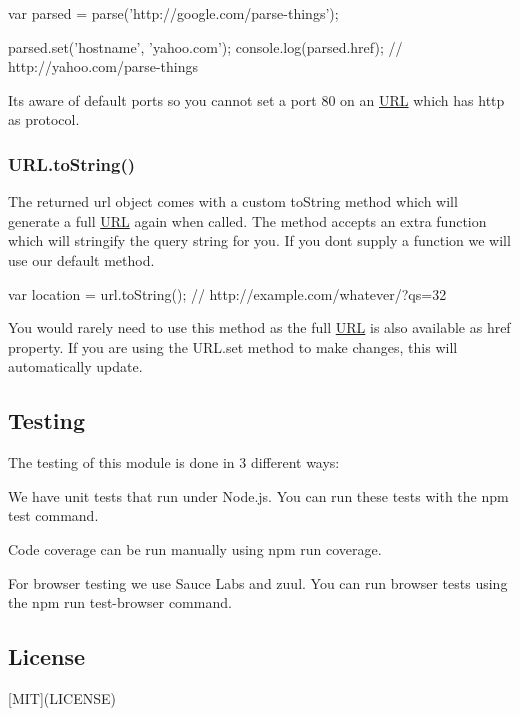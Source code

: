 \begin{DoxyCode}
var parsed = parse('http://google.com/parse-things');

parsed.set('hostname', 'yahoo.com');
console.log(parsed.href); // http://yahoo.com/parse-things
\end{DoxyCode}


It\textquotesingle{}s aware of default ports so you cannot set a port 80 on an \mbox{\hyperlink{namespace_u_r_l}{U\+RL}} which has {\ttfamily http} as protocol.

\subsubsection*{U\+R\+L.\+to\+String()}

The returned {\ttfamily url} object comes with a custom {\ttfamily to\+String} method which will generate a full \mbox{\hyperlink{namespace_u_r_l}{U\+RL}} again when called. The method accepts an extra function which will stringify the query string for you. If you don\textquotesingle{}t supply a function we will use our default method.


\begin{DoxyCode}
var location = url.toString(); // http://example.com/whatever/?qs=32
\end{DoxyCode}


You would rarely need to use this method as the full \mbox{\hyperlink{namespace_u_r_l}{U\+RL}} is also available as {\ttfamily href} property. If you are using the {\ttfamily U\+R\+L.\+set} method to make changes, this will automatically update.

\subsection*{Testing}

The testing of this module is done in 3 different ways\+:


\begin{DoxyEnumerate}
\item We have unit tests that run under Node.\+js. You can run these tests with the {\ttfamily npm test} command.
\item Code coverage can be run manually using {\ttfamily npm run coverage}.
\item For browser testing we use Sauce Labs and {\ttfamily zuul}. You can run browser tests using the {\ttfamily npm run test-\/browser} command.
\end{DoxyEnumerate}

\subsection*{License}

\mbox{[}M\+IT\mbox{]}(L\+I\+C\+E\+N\+SE) 
